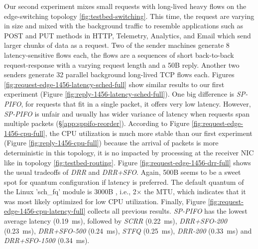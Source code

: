 Our second experiment mixes small requests with long-lived heavy flows
on the edge-switching topology \ref{fig:testbed-switching}. This time,
the request are varying in size and mixed with the background traffic
to resemble applications such as POST and PUT methods in HTTP,
Telemetry, Analytics, and Email which send larger chunks of data as
a request. Two of the sender machines generate 8 latency-sensitive
flows each, the flows are a sequences of short back-to-back
request-response with a varying request length and a 50B
reply. Another two senders generate 32 parallel background long-lived
TCP flows each. Figures \ref{fig:request-edge-1456-latency-sched-full}
show similar results to our first experiment
(Figure \ref{fig:reply-1456-latency-sched-full}). One big difference is
\textit{SP-PIFO}, for requests that fit in a single packet, it offers
very low latency. However, \textit{SP-PIFO} is unfair and usually has
wider variance of latency when requests span multiple packets
(\S\ref{app:sppifo-reorder}). According to
Figure \ref{fig:request-edge-1456-cpu-full}, the CPU utilization is much
more stable than our first experiment
(Figure \ref{fig:reply-1456-cpu-full}) because the arrival of packets is
more deterministic in this topology, it is no impacted by processing at
the receiver NIC like in topology
\ref{fig:testbed-routing}. Figure \ref{fig:request-edge-1456-drr-full}
shows the usual tradeoffs of \textit{DRR} and \textit{DRR+SFO}. Again,
500B seems to be a sweet spot for quantum configuration if latency is
preferred. The default quantum of the Linux 'sch\_fq' module is 3000B
\cite{sch-fq}, i.e., 2$\times$ the MTU, which indicates that it was
most likely optimized for low CPU utilization. Finally, Figure 
\ref{fig:request-edge-1456-cpu-latency-full} collects all previous
results.  \textit{SP-PIFO} has the lowest average latency (0.19~ms),
followed by \textit{SCRR} (0.22~ms), \textit{DRR+SFO-200} (0.23~ms),
\textit{DRR+SFO-500} (0.24~ms), \textit{STFQ} (0.25~ms),
\textit{DRR-200} (0.33~ms) and \textit{DRR+SFO-1500} (0.34~ms).


